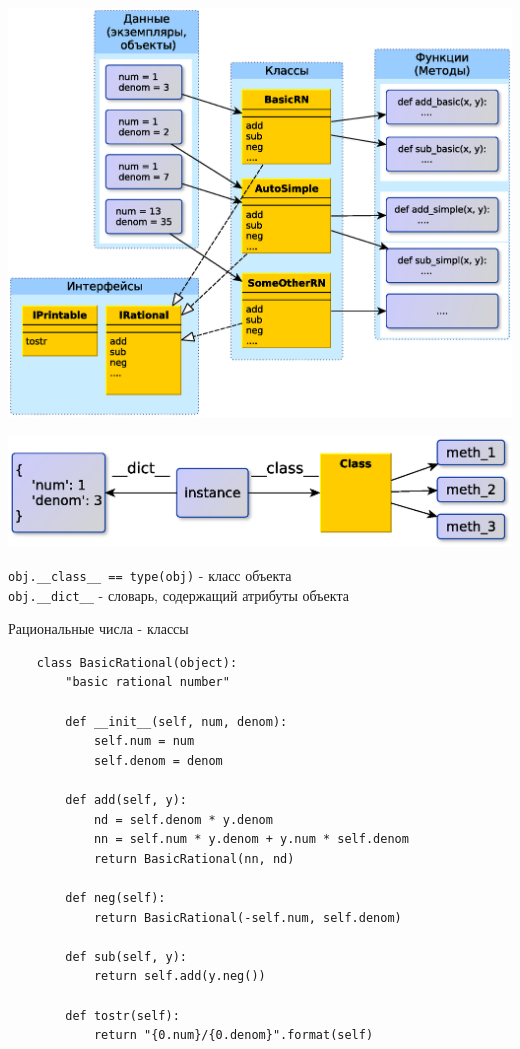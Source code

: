 \documentclass{article}
\begin{document}
\begin{center} \includegraphics[scale=0.8]{images/oop_style.eps} \end{center} 
\newpage

\begin{center} \includegraphics[scale=0.8]{images/python_instance.eps} \end{center} 
\lstinline!obj.__class__ == type(obj)! - класс объекта \\
\lstinline!obj.__dict__! - словарь, содержащий атрибуты объекта
\newpage

\begin{center} Рациональные числа - классы \end{center}
\begin{lstlisting}
    class BasicRational(object):
        "basic rational number"

        def __init__(self, num, denom):
            self.num = num
            self.denom = denom

        def add(self, y):
            nd = self.denom * y.denom
            nn = self.num * y.denom + y.num * self.denom
            return BasicRational(nn, nd)

        def neg(self):
            return BasicRational(-self.num, self.denom)

        def sub(self, y):
            return self.add(y.neg())

        def tostr(self):
            return "{0.num}/{0.denom}".format(self)
\end{lstlisting}
\newpage
\end{document}
